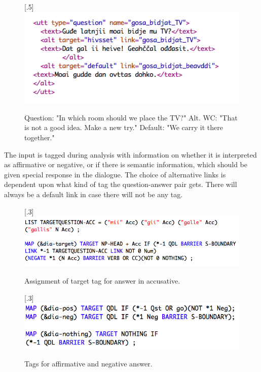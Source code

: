 \documentclass[11pt]{article}
\begin{document}
\begin{figure}%
\begin{center}
\scalebox{.5}[.5]{\includegraphics{presentation/img/gosabidjatTV.png}}\\
\caption{Question: "In which room should we place the TV?"
Alt. WC: "That is not a good idea. Make a new try." 
Default: "We carry it there together." 
}
\end{center}
\end{figure}

The input is tagged during analysis with information on whether it is interpreted as affirmative or negative, or if there is semantic information, which should be given special response in the dialogue. The choice of alternative links is dependent upon what kind of tag the question-answer pair gets. There will always be a default link in case there will not be any tag. 
 
\begin{figure}%
\begin{center}
\scalebox{.3}[.3]{\includegraphics{presentation/img/target_acc.png}}\\
\caption{Assignment of target tag for answer in accusative. 
}
\end{center}
\end{figure}

\begin{figure}%
\begin{center}
\scalebox{.3}[.3]{\includegraphics{presentation/img/aff_or_neg_colours.png}}\\
\caption{Tags for affirmative and negative answer. 
}
\end{center}
\end{figure}
\end{document}
